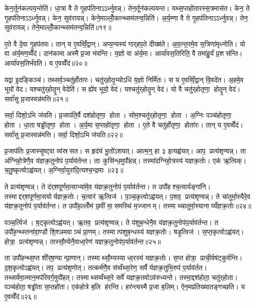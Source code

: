 केन॒र्तून॑कल्पय॒न्तेति॑। धा॒त्रा वै ते गृ॒हप॑तिनाऽऽर्ध्नुवन्न्। तेन॒र्तून॑कल्पयन्त। यथ्स॒प्तहो॑तारस्स॒त्रमास॑त। केन॒ ते गृ॒हप॑तिनाऽऽर्ध्नुवन्न्। केन॒ सुव॑रायन्न्। केने॒माल्लोँ॒कान्थ्सम॑तन्व॒न्निति॑। अ॒र्य॒म्णा वै ते गृ॒हप॑तिनाऽऽर्ध्नुवन्न्। तेन॒ सुव॑रायन्न्। तेने॒माल्लोँ॒कान्थ्सम॑तन्व॒न्निति॑॥१९॥

ए॒ते वै दे॒वा गृ॒हप॑तयः। तान् य ए॒वव्विँ॒द्वान्। अप्य॒न्यस्य॑ गार्‌हप॒ते दीख्ष॑ते। अ॒वा॒न्त॒रमे॒व स॒त्रिणा॑मृध्नोति। यो वा अ॑र्य॒मण॒व्वेँद॑। दान॑कामा अस्मै प्र॒जा भ॑वन्ति। य॒ज्ञो वा अ॑र्य॒मा। आर्या॑वस॒तिरिति॒ वै तमा॑हु॒र्यं प्र॒शस॑न्ति। आर्या॑वस॒तिर्भ॑वति। य ए॒वव्वेँद॑॥२०॥

यद्वा इ॒दङ्किञ्च॑। तथ्सर्व॒ञ्चतु॑र्\mbox{}होतारः। चतु॑र्‌होतृ॒भ्योऽधि॑ य॒ज्ञो निर्मि॑तः। स य ए॒वव्विँ॒द्वान्‌ वि॒वदे॑त। अ॒हमे॒व भूयो॑ वेद। यश्चतु॑र्‌होतॄ॒न् वेदेति॑। स ह्ये॑व भूयो॒ वेद॑। यश्चतु॑र्‌होतॄ॒न् वेद॑। यो वै चतु॑र्‌होतृणा॒ होतॄ॒न् वेद॑। सर्वा॑सु प्र॒जास्वन्न॑मत्ति॥२१॥

सर्वा॒ दिशो॒ऽभि ज॑यति। प्र॒जाप॑ति॒र्वै दश॑होतृणा॒ होता। सोम॒श्चतु॑र्‌होतृणा॒ होता। अ॒ग्निः पञ्च॑होतृणा॒ होता। धा॒ता षड्ढो॑तृणा॒ होता। अ॒र्य॒मा स॒प्तहो॑तृणा॒ होता। ए॒ते वै चतु॑र्\mbox{}होतृणा॒ होता॑रः। तान् य ए॒वव्वेँद॑। सर्वा॑सु प्र॒जास्वन्न॑मत्ति। सर्वा॒ दिशो॒ऽभि ज॑यति॥२२॥\anuvakamend[आ॒र्ध्नु॒व॒न्ना॒र्ध्नु॒व॒न्नित्ये॒वव्वेँदात्ति सर्वा॒ दिशो॒ऽभि ज॑यति (वै तेन॑ स॒त्रङ्केन॑ ॥ )]

प्र॒जाप॑तिः प्र॒जास्सृ॒ष्ट्वा व्य॑स्रसत। स हृद॑यं भू॒तो॑ऽशयत्। आत्म॒न्॒ हा ३ इत्यह्व॑यत्। आप॒ प्रत्य॑शृण्वन्न्। ता अ॑ग्निहो॒त्रेणै॒व य॑ज्ञक्र॒तुनोप॑ प॒र्याव॑र्तन्त। ताः कुसि॑न्ध॒मुपौ॑हन्न्। तस्मा॑दग्निहो॒त्रस्य॑ यज्ञक्र॒तोः। एक॑ ऋ॒त्विक्। च॒तु॒ष्कृत्वोऽह्व॑यत्। अ॒ग्निर्वा॒युरा॑दि॒त्यश्च॒न्द्रमाः॥२३॥

ते प्रत्य॑शृण्वन्न्। ते द॑र्‌शपूर्णमा॒साभ्या॑मे॒व य॑ज्ञक्र॒तुनोप॑ प॒र्याव॑र्तन्त। त उपौ॑हश्च॒त्वार्यङ्गा॑नि। तस्माद्दर्‌शपूर्णमा॒सयोर्यज्ञक्र॒तोः। च॒त्वार॑ ऋ॒त्विज॑। प॒ञ्च॒कृत्वोऽह्व॑यत्। प॒शव॒ प्रत्य॑शृण्वन्न्। ते चा॑तुर्मा॒स्यैरे॒व य॑ज्ञक्र॒तुनोप॑ प॒र्याव॑र्तन्त। त उपौ॑ह॒ल्लोँम॑ छ॒वीं मा॒समस्थि॑ म॒ज्जानम्। तस्माच्चातुर्मा॒स्यानाय्यँज्ञक्र॒तोः॥२४॥

पञ्च॒र्त्विज॑। ष॒ट्कृत्वोऽह्व॑यत्। ऋ॒तव॒ प्रत्य॑शृण्वन्न्। ते प॑शुब॒न्धेनै॒व य॑ज्ञक्र॒तुनोप॑प॒र्याव॑र्तन्त। त उपौ॑ह॒न्थ्स्तना॑वा॒ण्डौ शि॒श्ञमवाञ्चं प्रा॒णम्। तस्मात्पशुब॒न्धस्य॑ यज्ञक्र॒तोः। षडृ॒त्विज॑। स॒प्त॒कृत्वोऽह्व॑यत्। होत्रा॒ प्रत्य॑शृण्वन्न्। तास्सौ॒म्येनै॒वाध्व॒रेण॑ यज्ञक्र॒तुनोप॑प॒र्याव॑र्तन्त॥२५॥

ता उपौ॑हन्थ्स॒प्त शी॑र्‌ष॒ण्यान्प्रा॒णान्। तस्माथ्सौ॒म्यस्याध्व॒रस्य॑ यज्ञक्र॒तोः। स॒प्त होत्रा॒ प्राची॒र्वष॑ट्कुर्वन्ति। द॒श॒कृत्वोऽह्व॑यत्। तप॒ प्रत्य॑शृणोत्। तत्कर्म॑णै॒व स॑व्वँथ्स॒रेण॒ सर्वैर्यज्ञक्र॒तुभि॒रुप॑ प॒र्याव॑र्तत। तथ्सर्व॑मा॒त्मान॒मप॑रिवर्ग॒मुपौ॑हत्। तस्माथ्सव्वँथ्स॒रे सर्वे॑ यज्ञक्र॒तवोऽव॑रुध्यन्ते। तस्मा॒द्दश॑होता॒ चतु॑र्‌होता। पञ्च॑होता॒ षड्ढो॑ता स॒प्तहो॑ता। एक॑होत्रे ब॒लि ह॑रन्ति। हर॑न्त्यस्मै प्र॒जा ब॒लिम्। ऐन॒मप्र॑तिख्यातङ्गच्छति। य ए॒वव्वेँद॑॥२६॥\anuvakamend[च॒न्द्रमाश्चातुर्मा॒स्यानाय्यँज्ञक्र॒तोर॑ध्व॒रेण॑ यज्ञक्र॒तुनोप॑ प॒र्याव॑र्तन्त स॒प्तहो॑ता च॒त्वारि॑ च]

